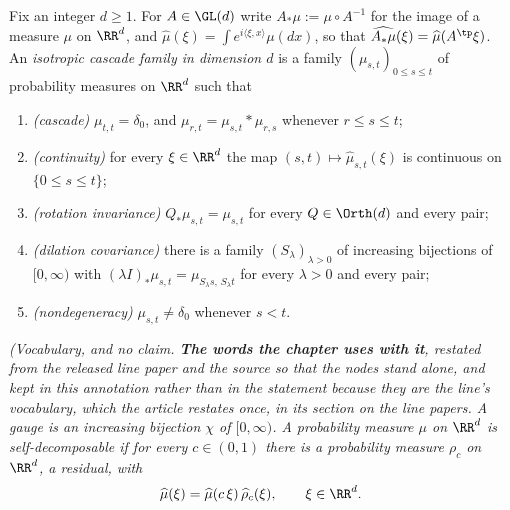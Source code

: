 \begin{definition}
\label{def:isotropic-kernel-family}
\leanok
Fix an integer $d \ge 1$. For $A \in \GL(d)$ write $A_*\mu := \mu \circ A^{-1}$ for the image of a
measure $\mu$ on $\RR^d$, and $\widehat\mu(\xi) = \int e^{i\langle\xi,x\rangle}\mu(dx)$, so that
$\widehat{A_*\mu}(\xi) = \widehat\mu(A^{\tp}\xi)$. An \emph{isotropic cascade family in dimension
$d$} is a family $(\mu_{s,t})_{0 \le s \le t}$ of probability measures on $\RR^d$ such that
\begin{enumerate}
\item[(I1)] \emph{(cascade)} $\mu_{t,t} = \delta_0$, and $\mu_{r,t} = \mu_{s,t} * \mu_{r,s}$
whenever $r \le s \le t$;
\item[(I2)] \emph{(continuity)} for every $\xi \in \RR^d$ the map
$(s,t) \mapsto \widehat\mu_{s,t}(\xi)$ is continuous on $\{0 \le s \le t\}$;
\item[(I3)] \emph{(rotation invariance)} $Q_*\mu_{s,t} = \mu_{s,t}$ for every $Q \in \Orth(d)$
and every pair;
\item[(I4)] \emph{(dilation covariance)} there is a family $(S_\lambda)_{\lambda > 0}$ of
increasing bijections of $[0,\infty)$ with $(\lambda I)_*\mu_{s,t} = \mu_{S_\lambda s,\,S_\lambda t}$
for every $\lambda > 0$ and every pair;
\item[(ND)] \emph{(nondegeneracy)} $\mu_{s,t} \ne \delta_0$ whenever $s < t$.
\end{enumerate}
\statusT\quad\emph{(Vocabulary, and no claim. \textbf{The words the chapter uses with it},
restated from the released line paper and the source so that the nodes stand alone, and kept in
this annotation rather than in the statement because they are the line's vocabulary, which the
article restates once, in its section on the line papers. A \emph{gauge} is an increasing
bijection $\chi$ of $[0,\infty)$. A probability measure $\mu$ on $\RR^d$ is
\emph{self-decomposable} if for every $c \in (0,1)$ there is a probability measure $\rho_c$ on
$\RR^d$, a \emph{residual}, with
\begin{equation}\label{eq:self-decomposable}
  \widehat\mu(\xi) = \widehat\mu(c\,\xi)\,\widehat\rho_c(\xi), \qquad \xi \in \RR^d .
\end{equation}
}
\end{definition}
